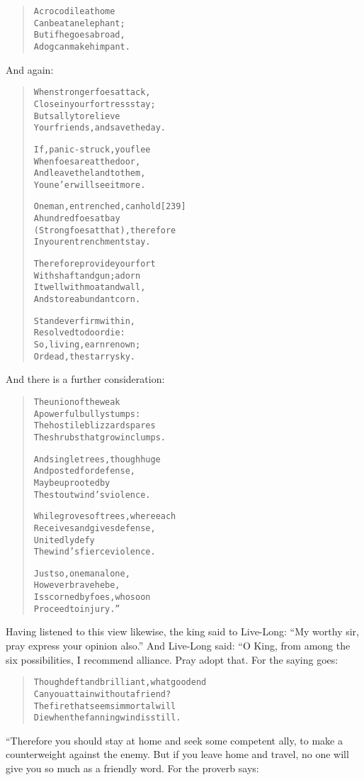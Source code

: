 \documentclass[article, twoside, 14pt]{memoir}
\renewenvironment{verbatim}{%
\begin{quote}%
\vskip -10pt%
\begin{alltt}\normalfont\large}{\end{alltt}%
\end{quote}%
\vskip -10pt
} %
\begin{document}
\begin{verbatim}
A crocodile at home
    Can beat an elephant;
But if he goes abroad,
    A dog can make him pant.
\end{verbatim}
And again:

\begin{verbatim}
When stronger foes attack,
    Close in your fortress stay;
But sally to relieve
    Your friends, and save the day.

If, panic-struck, you flee
    When foes are at the door,
And leave the land to them,
    You ne'er will see it more.

One man, entrenched, can hold                           [239]
    A hundred foes at bay
(Strong foes at that), therefore
    In your entrenchment stay.

Therefore provide your fort
    With shaft and gun; adorn
It well with moat and wall,
    And store abundant corn.

Stand ever firm within,
    Resolved to do or die:
So, living, earn renown;
    Or dead, the starry sky.
\end{verbatim}
And there is a further consideration:

\begin{verbatim}
The union of the weak
    A powerful bully stumps:
The hostile blizzard spares
    The shrubs that grow in clumps.

And single trees, though huge
    And posted for defense,
May be uprooted by
    The stout wind's violence.

While groves of trees, where each
    Receives and gives defense,
Unitedly defy
    The wind's fierce violence.

Just so, one man alone,
    However brave he be,
Is scorned by foes, who soon
    Proceed to injury.”
\end{verbatim}
Having listened to this view likewise, the king said to Live-Long:
``My worthy sir, pray express your opinion also.'' And Live-Long
said: “O King, from among the six possibilities, I recommend
alliance. Pray adopt that. For the saying goes:

\begin{verbatim}
Though deft and brilliant, what good end
Can you attain without a friend?
The fire that seems immortal will
Die when the fanning wind is still.
\end{verbatim}
“Therefore you should stay at home and seek some competent ally, to
make a counterweight against the enemy. But if you leave home and
travel, no one will give you so much as a friendly word. For the
proverb says:
\end{document}
